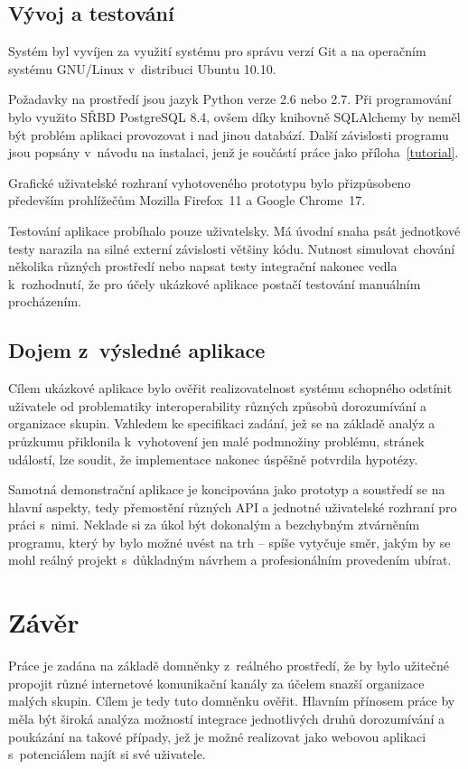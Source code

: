 \documentclass[12pt,oneside,final]{fithesis2}
\begin{document}
\section{Vývoj a testování}
Systém byl vyvíjen za využití systému pro správu verzí Git a na operačním systému GNU/Linux v~distribuci Ubuntu 10.10.

Požadavky na prostředí jsou jazyk Python verze 2.6 nebo 2.7. Při programování bylo využito SŘBD PostgreSQL 8.4, ovšem díky knihovně SQLAlchemy by neměl být problém aplikaci provozovat i nad jinou databází. Další závislosti programu jsou popsány v~návodu na instalaci, jenž je součástí práce jako příloha~\ref{tutorial}.

Grafické uživatelské rozhraní vyhotoveného prototypu bylo přizpůsobeno především prohlížečům Mozilla Firefox~11 a Google Chrome~17.

Testování aplikace probíhalo pouze uživatelsky. Má úvodní snaha psát jednotkové testy narazila na silné externí závislosti většiny kódu. Nutnost simulovat chování několika různých prostředí nebo napsat testy integrační nakonec vedla k~rozhodnutí, že pro účely ukázkové aplikace postačí testování manuálním procházením.



\section{Dojem z~výsledné aplikace}
Cílem ukázkové aplikace bylo ověřit realizovatelnost systému schopného odstínit uživatele od problematiky interoperability různých způsobů dorozumívání a organizace skupin. Vzhledem ke specifikaci zadání, jež se na základě analýz a průzkumu přiklonila k~vyhotovení jen malé podmnožiny problému, stránek událostí, lze soudit, že implementace nakonec úspěšně potvrdila hypotézy.

Samotná demonstrační aplikace je koncipována jako prototyp a soustředí se na hlavní aspekty, tedy přemostění různých API a jednotné uživatelské rozhraní pro práci s~nimi. Neklade si za úkol být dokonalým a bezchybným ztvárněním programu, který by bylo možné uvést na trh -- spíše vytyčuje směr, jakým by se mohl reálný projekt s~důkladným návrhem a profesionálním provedením ubírat.



\chapter{Závěr}
Práce je zadána na základě domněnky z~reálného prostředí, že by bylo užitečné propojit různé internetové komunikační kanály za účelem snazší organizace malých skupin. Cílem je tedy tuto domněnku ověřit. Hlavním přínosem práce by měla být široká analýza možností integrace jednotlivých druhů dorozumívání a poukázání na takové případy, jež je možné realizovat jako webovou aplikaci s~potenciálem najít si své uživatele.
\end{document}
